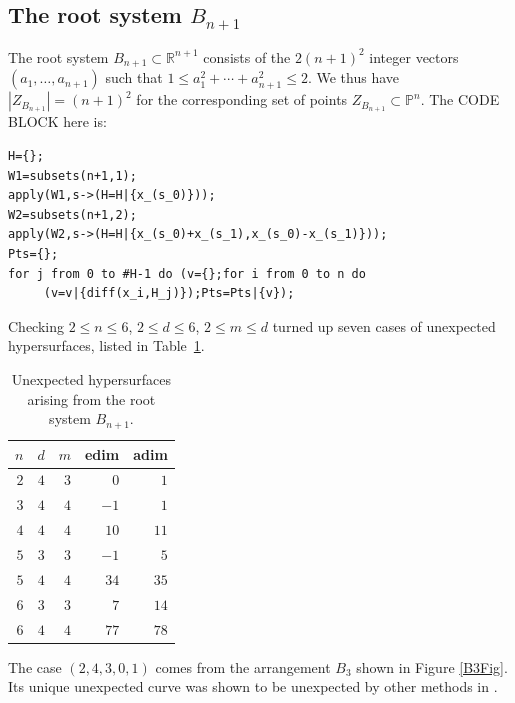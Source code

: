 \documentclass[12pt]{amsart}
\numberwithin{equation}{section}
\theoremstyle{definition}
\newcommand{\RR}{ \ensuremath{\mathbb{R}}}
\newcommand{\PP}{ \ensuremath{\mathbb{P}}}
\begin{document}
\subsection{The root system \texorpdfstring{$B_{n+1}$}{Bn}}
The root system $B_{n+1}\subset\RR^{n+1}$ consists of the $2(n+1)^2$ integer vectors $(a_1,\ldots,a_{n+1})$ 
such that $1\leq a_1^2+\cdots+a_{n+1}^2\leq 2$.
We thus have $|Z_{B_{n+1}}|=(n+1)^2$ for the corresponding set of points $Z_{B_{n+1}}\subset\PP^n$.
The CODE BLOCK here is:
\begin{verbatim}
H={};
W1=subsets(n+1,1);
apply(W1,s->(H=H|{x_(s_0)}));
W2=subsets(n+1,2);
apply(W2,s->(H=H|{x_(s_0)+x_(s_1),x_(s_0)-x_(s_1)}));
Pts={};
for j from 0 to #H-1 do (v={};for i from 0 to n do 
     (v=v|{diff(x_i,H_j)});Pts=Pts|{v});
\end{verbatim}
Checking $2\leq n\leq6$, $2\leq d\leq6$, $2\leq m\leq d$ turned up
seven cases of unexpected hypersurfaces, listed in Table~\ref{table: unexpected hypersurfaces}.

\begin{table}
\begin{tabular}{rrrrr}
$n$ & $d$ & $m$ & edim & adim \\
\hline
$2$ & $4$ & $3$ & $0$ & $1$ \\
$3$ & $4$ & $4$ & $-1$ & $1$ \\
$4$ & $4$ & $4$ & $10$ & $11$ \\
$5$ & $3$ & $3$ & $-1$ & $5$ \\
$5$ & $4$ & $4$ & $34$ & $35$ \\
$6$ & $3$ & $3$ & $7$ & $14$ \\
$6$ & $4$ & $4$ & $77$ & $78$ \\
\end{tabular}
\caption{Unexpected hypersurfaces arising from the root system $B_{n+1}$.}\label{table: unexpected hypersurfaces}
\end{table}

The case $(2, 4, 3, 0, 1)$ comes from the arrangement $B_3$ shown in Figure \ref{B3Fig}.
Its unique unexpected curve was shown to be unexpected by other methods in \cite{CHMN}.
\end{document}
